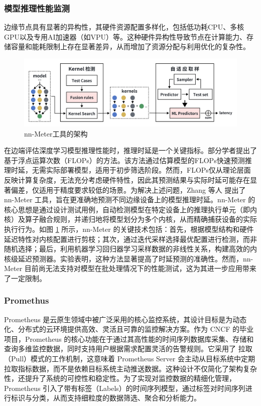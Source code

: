 \subsubsection{模型推理性能监测}

边缘节点具有显著的异构性，其硬件资源配置多样化，包括低功耗CPU、多核GPU以及专用AI加速器（如VPU）等。这种硬件异构性导致节点在计算能力、存储容量和能耗限制上存在显著差异，从而增加了资源分配与利用优化的复杂性。

\begin{figure}[ht]
  \centering
  \includegraphics[width=\linewidth]{pics/2-5nnmeter.png}
  \caption{nn-Meter工具的架构\cite{zhang2021nn}}
  \label{fig:2-5nnmeter}
\end{figure}

在边端评估深度学习模型推理性能时，推理时延是一个关键指标。部分学者\cite{he2018amc,tan2019mnasnet}提出了基于浮点运算次数（FLOPs）的方法。该方法通过估算模型的FLOPs快速预测推理时延，无需实际部署模型，适用于初步筛选阶段。然而，FLOPs仅从理论层面反映计算复杂度，无法充分考虑硬件特性，因此其预测结果与实际时延可能存在显著偏差，仅适用于精度要求较低的场景。为解决上述问题，Zhang 等人\cite{zhang2021nn} 提出了 nn-Meter 工具，旨在更准确地预测不同边缘设备上的模型推理时延。nn-Meter 的核心思想是通过设计测试用例，自动检测模型在特定设备上的推理执行单元（即内核）及算子融合规则，并递归地将模型划分为多个内核，从而精确捕获设备的实际执行行为。如图 \ref{fig:2-5nnmeter} 所示，nn-Meter 的关键技术包括：首先，根据模型结构和硬件延迟特性对内核配置进行剪枝；其次，通过迭代采样选择最优配置进行检测，而非随机选择；最后，利用机器学习回归器学习采样数据的非线性关系，构建高效的内核级延迟预测器。实验表明，这种方法显著提高了时延预测的准确性。然而，nn-Meter 目前尚无法支持对模型在批处理情况下的性能测试，这为其进一步应用带来了一定限制。

\subsubsection{Promethus}

Prometheus 是云原生领域中被广泛采用的核心监控系统，其设计目标是为动态化、分布式的云环境提供高效、灵活且可靠的监控解决方案。作为 CNCF 的毕业项目，Prometheus 的核心功能在于通过其高性能的时间序列数据库采集、存储和查询多维监控数据，同时支持用户根据需求配置灵活的告警规则。它采用了 拉取（Pull）模式的工作机制，这意味着 Prometheus Server 会主动从目标系统中定期拉取指标数据，而不是依赖目标系统主动推送数据。这种设计不仅简化了架构复杂性，还提升了系统的可控性和稳定性。为了实现对监控数据的精细化管理，Prometheus 引入了带有标签（Labels）的时间序列模型，通过标签对时间序列进行标识与分类，从而支持细粒度的数据筛选、聚合和分析能力。

